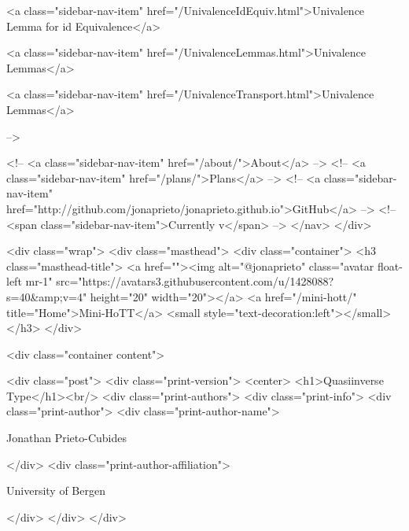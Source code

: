       
    
      
        
          <a class="sidebar-nav-item" href="/UnivalenceIdEquiv.html">Univalence Lemma for id Equivalence</a>
        
      
    
      
        
          <a class="sidebar-nav-item" href="/UnivalenceLemmas.html">Univalence Lemmas</a>
        
      
    
      
        
          <a class="sidebar-nav-item" href="/UnivalenceTransport.html">Univalence Lemmas</a>
        
      
     -->

    <!-- <a class="sidebar-nav-item" href="/about/">About</a> -->
    <!-- <a class="sidebar-nav-item" href="/plans/">Plans</a> -->
    <!-- <a class="sidebar-nav-item" href="http://github.com/jonaprieto/jonaprieto.github.io">GitHub</a> -->
    <!-- <span class="sidebar-nav-item">Currently v</span> -->
  </nav>
</div>

    <div class="wrap">
      <div class="masthead">
        <div class="container">
          <h3 class="masthead-title">
            <a href=""><img alt="@jonaprieto" class="avatar float-left mr-1" src="https://avatars3.githubusercontent.com/u/1428088?s=40&amp;v=4" height="20" width="20"></a>
            <a href="/mini-hott/" title="Home">Mini-HoTT</a>
            <small style="text-decoration:left"></small>
          </h3>
        </div>
      
      <div class="container content">
        







<div class="post">
  <div class="print-version">
    <center>
      <h1>Quasiinverse Type</h1><br/>
        <div class="print-authors">
          <div class="print-info">
            <div class="print-author">
              <div class="print-author-name">
                
                  Jonathan Prieto-Cubides
                
              </div>
              <div class="print-author-affiliation">
                
                  University of Bergen
                
                </div>
            </div>
          </div>
          
